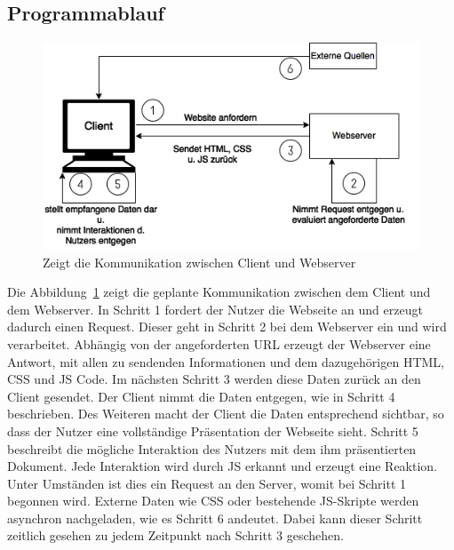 \subsection{Programmablauf}
\label{sec:Programmablauf}
\begin{figure}[h]
\centering
\includegraphics[scale=0.7]{img/programmablauf}
\caption{Zeigt die Kommunikation zwischen Client und Webserver}\label{fig:programmablauf}
\end{figure}
Die Abbildung~\ref{fig:programmablauf} zeigt die geplante Kommunikation zwischen dem Client und dem Webserver.
In Schritt 1 fordert der Nutzer die Webseite an und erzeugt dadurch einen Request. Dieser geht in Schritt 2 bei dem Webserver ein und wird verarbeitet. Abhängig von der angeforderten URL erzeugt der Webserver eine Antwort, mit allen zu sendenden Informationen und dem dazugehörigen \ac{HTML}, \ac{CSS} und \ac{JS} Code. Im nächsten Schritt 3 werden diese Daten zurück an den Client gesendet. Der Client nimmt die Daten entgegen, wie in Schritt 4 beschrieben. Des Weiteren macht der Client die Daten entsprechend sichtbar, so dass der Nutzer eine vollständige Präsentation der Webseite sieht. Schritt 5 beschreibt die mögliche Interaktion des Nutzers mit dem ihm präsentierten Dokument. Jede Interaktion wird durch \ac{JS} erkannt und erzeugt eine Reaktion. Unter Umständen ist dies ein Request an den Server, womit bei Schritt 1 begonnen wird. Externe Daten wie \ac{CSS} oder bestehende \ac{JS}-Skripte  werden asynchron nachgeladen, wie es Schritt 6 andeutet. Dabei kann dieser Schritt zeitlich gesehen zu jedem Zeitpunkt nach Schritt 3 geschehen.


